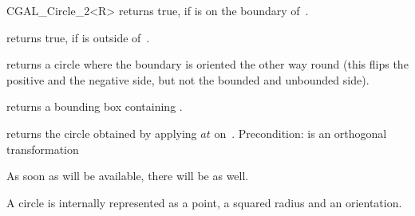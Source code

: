 \begin {classtemplate} {CGAL_Circle_2<R>}
       {returns true, if  is on the boundary of~\var.}

       {returns true, if  is outside of~\var.}

       {returns a circle where the boundary is oriented the other
        way round (this flips the positive and the negative side,
          but not the bounded and unbounded side).} 

       {returns a bounding box containing \var.}

       {returns the circle obtained by applying $at$ on~\var.
        Precondition:  is an orthogonal transformation}

As soon as  will be available, there will be
as well.





\implementation
A circle is internally represented as a point, a squared radius and an orientation.

\end {classtemplate} 

%

